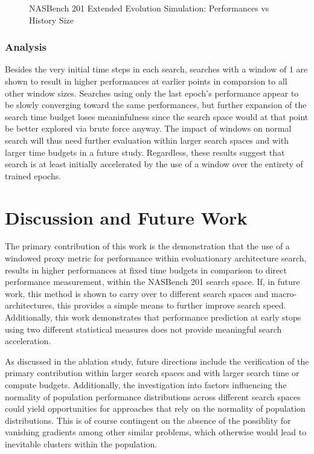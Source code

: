 \documentclass[twocolumn]{article}
\begin{document}
\begin{figure}[!h]
    \begin{center}
        \resizebox{\columnwidth}{!}{
            
        }
        \caption{NASBench 201 Extended Evolution Simulation: Performances vs History Size}
        \label{fig:evo_ext_nasbench_all_perfs}
    \end{center}
\end{figure}




\subsubsection{Analysis}

Besides the very initial time steps in each search, searches with a window of 1 are shown to result in higher performances at earlier points in comparsion to all other
window sizes. 
Searches using only the last epoch's performance appear to be slowly converging toward the same performances, but further expansion of the search time budget loses
meaninfulness since the search space would at that point be better explored via brute force anyway.
The impact of windows on normal search will thus need further evaluation within larger search spaces and with larger time budgets in a future study.
Regardless, these results suggest that search is at least initially accelerated by the use of a window over the entirety of trained epochs.

\section{Discussion and Future Work}

The primary contribution of this work is the demonstration that the use of a windowed proxy metric for performance within evoluationary architecture search,
results in higher performances at fixed time budgets in comparison to direct performance measurement, within the NASBench 201 search space.
If, in future work, this method is shown to carry over to different search spaces and macro-architectures, this provides a simple
means to further improve search speed.
Additionally, this work demonstrates that performance prediction at early stops using two different statistical measures does not provide meaningful search acceleration.

As discussed in the ablation study, future directions include the verification of the primary contribution within larger search spaces and with larger search time or compute budgets.
Additionally, the investigation into factors influencing the normality of population performance distributions across different search spaces
could yield opportunities for approaches that rely on the normality of population distributions. 
This is of course contingent on the absence of the possiblity for vanishing gradients among other similar problems, which otherwise would
lead to inevitable clusters within the population.
\end{document}
